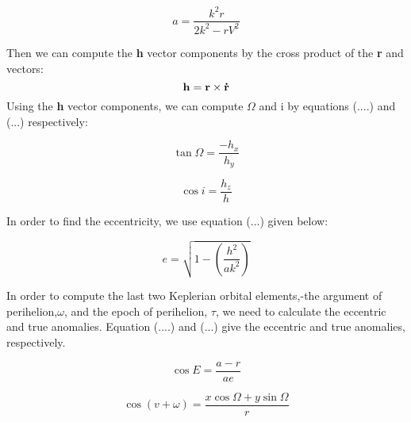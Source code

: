 \documentclass[letterpaper,12pt]{article}
\begin{document}
\begin{equation}
a=\frac{k^2r}{2k^2-rV^2}
\end{equation}

Then we can compute the {\bf h} vector components by the cross product of the {\bf r} and {\bf {}} vectors:
\begin{equation}
{\bf h}= {\bf r} \times {\bf \dot{r}}
\end{equation}
Using the {\bf h} vector components, we can compute \begin{math} \Omega \end{math} and i by equations (....) and (...) respectively:

\begin{equation}
\tan \Omega = \frac{-h_{x}}{h_{y}}
\end{equation}

\begin{equation}
\cos i = \frac{h_{z}}{h}
\end{equation}

In order to find the eccentricity, we use equation (...) given below:

\begin{equation}
e=\sqrt{1-(\frac{h^2}{ak^2})}
\end{equation}

In order to compute the last two Keplerian orbital elements,-the argument of perihelion,\begin{math} \omega \end{math}, and the epoch of perihelion, \begin{math} \tau \end{math}, we need to calculate the eccentric and true anomalies. Equation (....) and (...) give the eccentric and true anomalies, respectively.

\begin{equation}
\cos E = \frac{a-r}{ae}
\end{equation}

\begin{equation}
\cos (v+\omega) = \frac{x \cos \Omega + y \sin \Omega}{r} 
\end{equation}

\end{document}

